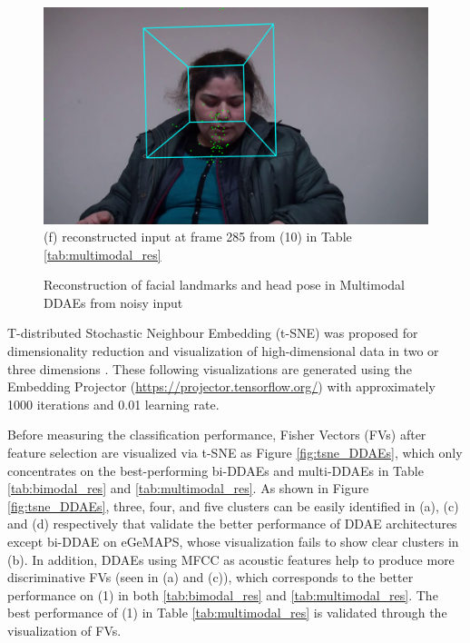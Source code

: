 \begin{figure}[htb]
\begin{minipage}[c]{0.42\linewidth}
    \includegraphics[width=\textwidth]{images/facial/recons_285_face_0_multiDDAE_egemaps.png} \\
    (f) reconstructed input at frame 285 from (10) in Table \ref{tab:multimodal_res}
    \end{minipage}
    \caption{Reconstruction of facial landmarks and head pose in Multimodal DDAEs from noisy input}
    \label{fig:reconstruction_multiDDAE}
\end{figure}


T-distributed Stochastic Neighbour Embedding (t-SNE) was proposed for dimensionality reduction and visualization of high-dimensional data in two or three dimensions \cite{maaten2008}. These following visualizations are generated using the Embedding Projector (\url{https://projector.tensorflow.org/}) with approximately 1000 iterations and 0.01 learning rate.

Before measuring the classification performance, Fisher Vectors (FVs) after feature selection are visualized via t-SNE as Figure \ref{fig:tsne_DDAEs}, which only concentrates on the best-performing bi-DDAEs and multi-DDAEs in Table \ref{tab:bimodal_res} and \ref{tab:multimodal_res}. As shown in Figure \ref{fig:tsne_DDAEs}, three, four, and five clusters can be easily identified in (a), (c) and (d) respectively that validate the better performance of DDAE architectures except bi-DDAE on eGeMAPS, whose visualization fails to show clear clusters in (b). In addition, DDAEs using MFCC as acoustic features help to produce more discriminative FVs (seen in (a) and (c)), which corresponds to the better performance on (1) in both \ref{tab:bimodal_res} and \ref{tab:multimodal_res}. The best performance of (1) in Table \ref{tab:multimodal_res} is validated through the visualization of FVs.


